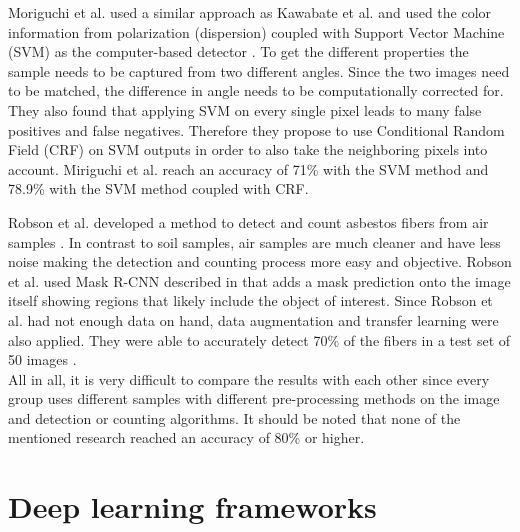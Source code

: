 Moriguchi et al. used a similar approach as Kawabate et al. and used the color information from polarization (dispersion) coupled with Support Vector Machine (SVM) as the computer-based detector \cite{moriguchi2008asbestos}. To get the different properties the sample needs to be captured from two different angles. Since the two images need to be matched, the difference in angle needs to be computationally corrected for. They also found that applying SVM on every single pixel leads to many false positives and false negatives. Therefore they propose to use Conditional Random Field (CRF) on SVM outputs in order to also take the neighboring pixels into account. Miriguchi et al. reach an accuracy of 71\% with the SVM method and 78.9\% with the SVM method coupled with CRF.

Robson et al. developed a method to detect and count asbestos fibers from air samples \cite{robson2018fiac}. In contrast to soil samples, air samples are much cleaner and have less noise making the detection and counting process more easy and objective. Robson et al. used Mask R-CNN described in \cite{he2017mask} that adds a mask prediction onto the image itself showing regions that likely include the object of interest. Since Robson et al. had not enough data on hand, data augmentation and transfer learning were also applied. They were able to accurately detect 70\% of the fibers in a test set of 50 images  \cite{robson2018fiac}. \\


All in all, it is very difficult to compare the results with each other since every group uses different samples with different pre-processing methods on the image and detection or counting algorithms. It should be noted that none of the mentioned research reached an accuracy of 80\% or higher.


\section{Deep learning frameworks}

